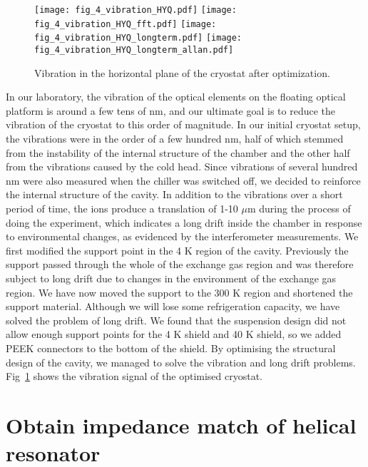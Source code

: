 \begin{figure}
    \centering
    {\texttt{[image: fig\_4\_vibration\_HYQ.pdf]}}
    {\texttt{[image: fig\_4\_vibration\_HYQ\_fft.pdf]}}
    {\texttt{[image: fig\_4\_vibration\_HYQ\_longterm.pdf]}}
    {\texttt{[image: fig\_4\_vibration\_HYQ\_longterm\_allan.pdf]}}
    \caption{Vibration in the horizontal plane of the cryostat after optimization.}
    \label{fig:fig_4_vibration_HYQ}
\end{figure}

In our laboratory, the vibration of the optical elements on the floating optical platform is around a few tens of nm, and our ultimate goal is to reduce the vibration of the cryostat to this order of magnitude. In our initial cryostat setup, the vibrations were in the order of a few hundred nm, half of which stemmed from the instability of the internal structure of the chamber and the other half from the vibrations caused by the cold head. Since vibrations of several hundred nm were also measured when the chiller was switched off, we decided to reinforce the internal structure of the cavity. In addition to the vibrations over a short period of time, the ions produce a translation of 1-10 $\mu$m during the process of doing the experiment, which indicates a long drift inside the chamber in response to environmental changes, as evidenced by the interferometer measurements. We first modified the support point in the 4 K region of the cavity. Previously the support passed through the whole of the exchange gas region and was therefore subject to long drift due to changes in the environment of the exchange gas region. We have now moved the support to the 300 K region and shortened the support material. Although we will lose some refrigeration capacity, we have solved the problem of long drift. We found that the suspension design did not allow enough support points for the 4 K shield and 40 K shield, so we added PEEK connectors to the bottom of the shield. By optimising the structural design of the cavity, we managed to solve the vibration and long drift problems. Fig~\ref{fig:fig_4_vibration_HYQ} shows the vibration signal of the optimised cryostat.



\section {Obtain impedance match of helical resonator}

